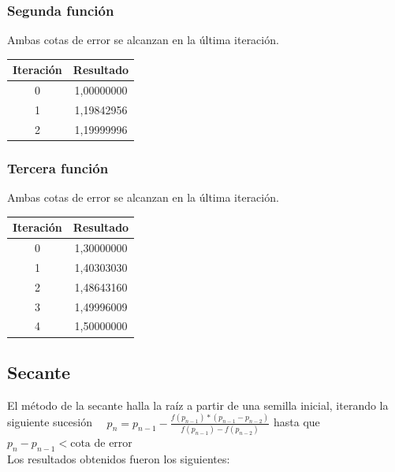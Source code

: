 \documentclass[titlepage,a4paper]{article}
\begin{document}
\subsubsection{Segunda función}\label{sec:NRM2}
Ambas cotas de error se alcanzan en la última iteración.
\begin{center}
    \begin{tabular}{| c | c |}
    \hline
     Iteración & Resultado \\ \hline
    0     & 1,00000000 \\
        1     & 1,19842956 \\
        2     & 1,19999996 \\
    \hline
    \end{tabular}
\end{center}
\subsubsection{Tercera función}\label{sec:NRM3}
Ambas cotas de error se alcanzan en la última iteración.
\begin{center}
    \begin{tabular}{| c | c |}
    \hline
     Iteración & Resultado \\ \hline
        0     & 1,30000000 \\
        1     & 1,40303030 \\
        2     & 1,48643160 \\
        3     & 1,49996009 \\
        4     & 1,50000000 \\
    \hline
    \end{tabular}
\end{center}

\subsection{Secante}\label{sec:biseccion}
El método de la secante halla la raíz a partir de una semilla inicial, iterando la siguiente sucesión
$\quad p_{n} =p_{n-1}-\frac{f (p_{n-1})*(p_{n-1}-p_{n-2})}{f(p_{n-1})-f(p_{n-2})}$ hasta que $p_{n}-p_{n-1} < \mbox{cota de error}$
\\

Los resultados obtenidos fueron los siguientes:
\end{document}
